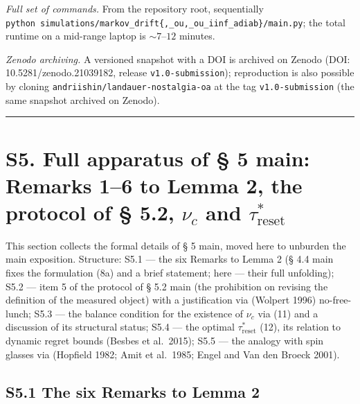 \documentclass[pdflatex,sn-mathphys-ay]{sn-jnl}
\begin{document}
\emph{Full set of commands.} From the repository root, sequentially \texttt{python\ simulations/markov\_drift\{,\_ou,\_ou\_iinf\_adiab\}/main.py}; the total runtime on a mid-range laptop is \(\sim 7\)--\(12\) minutes.



\emph{Zenodo archiving.} A versioned snapshot with a DOI is archived on Zenodo (DOI: 10.5281/zenodo.21039182, release \texttt{v1.0-submission}); reproduction is also possible by cloning \texttt{andriishin/landauer-nostalgia-oa} at the tag \texttt{v1.0-submission} (the same snapshot archived on Zenodo).



\begin{center}\rule{0.5\linewidth}{0.5pt}\end{center}



\section*{\texorpdfstring{S5. Full apparatus of § 5 main: Remarks 1--6 to Lemma 2, the protocol of § 5.2, \(\nu_c\) and \(\tau_{\text{reset}}^*\)}{S5. Full apparatus of § 5 main: Remarks 1--6 to Lemma 2, the protocol of § 5.2, \textbackslash nu\_c and \textbackslash tau\_\{\textbackslash text\{reset\}\}\^{}*}}\label{s5.-full-apparatus-of-5-main-remarks-16-to-lemma-2-the-protocol-of-5.2-nu_c-and-tau_textreset}



This section collects the formal details of § 5 main, moved here to unburden the main exposition. Structure: S5.1 --- the six Remarks to Lemma 2 (§ 4.4 main fixes the formulation (8a) and a brief statement; here --- their full unfolding); S5.2 --- item 5 of the protocol of § 5.2 main (the prohibition on revising the definition of the measured object) with a justification via (Wolpert 1996) no-free-lunch; S5.3 --- the balance condition for the existence of \(\nu_c\) via (11) and a discussion of its structural status; S5.4 --- the optimal \(\tau_{\text{reset}}^*\) (12), its relation to dynamic regret bounds (Besbes et al.~2015); S5.5 --- the analogy with spin glasses via (Hopfield 1982; Amit et al.~1985; Engel and Van den Broeck 2001).



\subsection*{S5.1 The six Remarks to Lemma 2}\label{s5.1-the-six-remarks-to-lemma-2}
\end{document}
